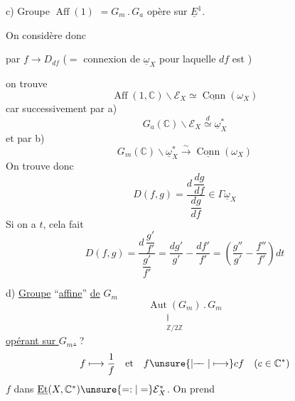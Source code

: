 c) Groupe $\operatorname{Aff}(1)$ 
$=G_m\mathbin{.}G_a$ opère sur $\underline E^1$.

On considère donc

par $f\longrightarrow D_{df}$ ($=$ connexion de $\underline\omega_X$
pour laquelle  $df$ est
)

on trouve
\[
\operatorname{Aff}(1,\mathbb C)\backslash \mathcal E_X
\simeq\underline{\operatorname{Conn}}(\omega_X)
\]
car successivement par a)
\[
G_a(\mathbb C)\backslash \mathcal E_X\overset{d}{\simeq}\underline\omega_X^*
\]
et par b)
\[
G_m(\mathbb C)\backslash\underline\omega_X^*
\overset{\sim}{\longrightarrow}\underline{\operatorname{Conn}}(\omega_X)
\]
On trouve donc
\[
D(f,g)=\frac{d\,\dfrac{dg}{df}}{\dfrac{dg}{df}}
\in\Gamma\underline\omega_X
\]
Si on a  $t$, cela fait
\[
D(f,g)=\frac{d\,\dfrac{g'}{f'}}{\dfrac{g'}{f'}}
=\frac{dg'}{g'}-\frac{df'}{f'}
=\left(\frac{g''}{g'}-\frac{f''}{f'}\right)dt
\]


d)  \uline{Groupe} ``\uline{affine}'' \uline{de} $G_m$
\[
\underset{\substack{\Vert\\\mathbb Z/2\mathbb Z}}{\operatorname{Aut}(G_m)}
\mathbin{.}G_m
\]
\uline{opérant sur $G_m$.} ?
\[
f\longmapsto\frac1f\quad\text{et}\quad
f\unsure{\mathrel{\mid\!\!-\!\!-}|\longmapsto}cf
\quad(c\in\mathbb C^*)
\]
$f$ dans $\underline{\operatorname{Et}}(X,\mathbb C^*)
\unsure{\mathrel{=:}|=}\mathcal E_X^*$. On prend

